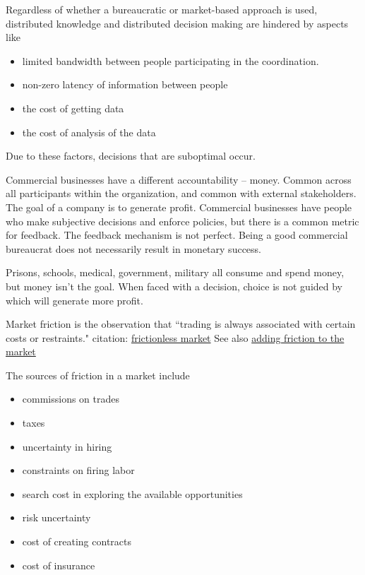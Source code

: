 Regardless of whether a bureaucratic or market-based approach is used, 
distributed knowledge and distributed decision making are hindered by aspects like
\begin{itemize}
    \item limited bandwidth between people participating in the coordination.
    \item non-zero latency of information between people
    \item the cost of getting data
    \item the cost of analysis of the data
\end{itemize}
Due to these factors, decisions that are suboptimal occur. 




Commercial businesses have a different accountability -- money. Common across all participants within the organization, and common with external stakeholders. The goal of a company is to generate profit. Commercial businesses have people who make subjective decisions and enforce policies, but there is a common metric for feedback. The feedback mechanism is not perfect. Being a good commercial bureaucrat does not necessarily result in monetary success.

Prisons, schools, medical, government, military all consume and spend money, but money isn't the goal. When faced with a decision, choice is not guided by which will generate more profit.





Market friction is the observation that ``trading is always associated with certain costs or restraints."
citation: \href{http://www.investopedia.com/terms/f/frictionlessmarket.asp}{frictionless market}
See also \href{https://insight.kellogg.northwestern.edu/article/adding_friction_to_the_market}{adding friction to the market}

The sources of friction in a market include
\begin{itemize}
    \item commissions on trades
    \item taxes
    \item uncertainty in hiring
    \item constraints on firing labor
    \item search cost in exploring the available opportunities
    \item risk uncertainty
    \item cost of creating contracts
    \item cost of insurance
\end{itemize}

